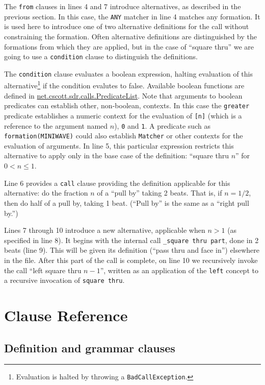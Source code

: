 \documentclass[12pt]{article}
\newcommand{\clause}[1]{\texttt{#1}}
\renewcommand{\call}[1]{\texttt{#1}} %
\newcommand{\package}[1]{\url{#1}}
\begin{document}
The \clause{from} clauses in lines 4 and 7 introduce alternatives, as
described in the previous section.  In this case, the \texttt{ANY}
matcher in line 4 matches any formation.  It is used here to introduce
one of two alternative definitions for the call without constraining
the formation.  Often alternative definitions are distinguished by the
formations from which they are applied, but in the case of ``square
thru'' we are going to use a \clause{condition} clause to distinguish
the definitions.

The \clause{condition} clause evaluates a boolean expression, halting
evaluation of this alternative\footnote{Evaluation is halted by
  throwing a \texttt{BadCallException}.} if the condition evalutes to
false.  Available boolean functions are defined in
\package{net.cscott.sdr.calls.PredicateList}.  Note that arguments to
boolean predicates can establish other, non-boolean, contexts.  In
this case the \call{greater} predicate establishes a numeric context for
the evaluation of \texttt{[n]} (which is a reference to the argument
named $n$), \texttt{0} and \texttt{1}.  A predicate such as
\texttt{formation(MINIWAVE)} could also establish \texttt{Matcher} or other
contexts for the evaluation of arguments.  In line 5, this particular
expression restricts this alternative to apply only in the base case
of the definition: ``square thru $n$'' for $0 < n \leq 1$.

Line 6 provides a \clause{call} clause providing the definition
applicable for this alternative: do the fraction $n$ of a
``pull by'' taking 2 beats.  That is, if $n=1/2$, then do half of a
pull by, taking 1 beat.  (``Pull by'' is the same as a ``right pull by.'')

Lines 7 through 10 introduce a new alternative, applicable when $n>1$
(as specified in line 8).
It begins with the internal call \call{\_square thru part}, done in 2
beats (line 9).  This will be given its definition (``pass thru and face in'')
elsewhere in the file.  After this part of the call is complete, on
line 10 we recursively
invoke the call ``left square thru $n-1$'', written as an application
of the \call{left} concept to a recursive invocation of \call{square thru}.

\section{Clause Reference}

\subsection{Definition and grammar clauses}
\end{document}
